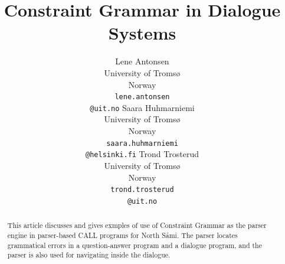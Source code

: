 \documentclass[11pt]{article}
\begin{document}
\title{Constraint Grammar in Dialogue Systems}

\author{Lene Antonsen\\
  University of Tromsø\\
  Norway\\
  {\tt lene.antonsen}\\{\tt @uit.no}  \And
  Saara Huhmarniemi\\
  University of Tromsø\\
  Norway\\
  {\tt saara.huhmarniemi}\\{\tt @helsinki.fi}  \And
  Trond Trosterud\\
  University of Tromsø\\
  Norway\\
  {\tt trond.trosterud}\\{\tt @uit.no}}



\maketitle
{}


 
\maketitle

\begin{abstract}
This article discusses and gives exmples of use of Constraint Grammar as the parser engine in parser-based CALL programs for North Sámi. The parser locates grammatical errors in a question-answer program and a dialogue program, and the parser is also used for navigating inside the dialogue.

\end{abstract}
\end{document}
